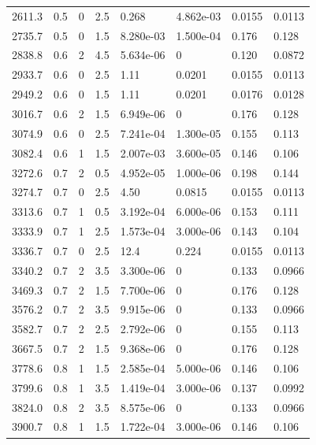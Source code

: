 \documentclass[preview]{standalone}
\begin{document}
{{{\begin{tabular}{L{1.2cm}C{1.2cm} C{0.3cm}C{0.5cm} C{1.4cm}C{1.4cm} C{1.4cm}C{1.4cm}}
  2611.3  &   0.5  & 0     & 2.5 &  0.268  & 4.862e-03  & 0.0155 &  0.0113   \\ 
  2735.7  &   0.5  & 0     & 1.5 &  8.280e-03  & 1.500e-04  & 0.176 &  0.128   \\ 
  2838.8  &   0.6  & 2     & 4.5 &  5.634e-06  & 0  & 0.120 &  0.0872   \\ 
  2933.7  &   0.6  & 0     & 2.5 &  1.11  & 0.0201  & 0.0155 &  0.0113   \\ 
  2949.2  &   0.6  & 0     & 1.5 &  1.11  & 0.0201  & 0.0176 &  0.0128   \\ 
  3016.7  &   0.6  & 2     & 1.5 &  6.949e-06  & 0  & 0.176 &  0.128   \\ 
  3074.9  &   0.6  & 0     & 2.5 &  7.241e-04  & 1.300e-05  & 0.155 &  0.113   \\ 
  3082.4  &   0.6  & 1     & 1.5 &  2.007e-03  & 3.600e-05  & 0.146 &  0.106   \\ 
  3272.6  &   0.7  & 2     & 0.5 &  4.952e-05  & 1.000e-06  & 0.198 &  0.144   \\ 
  3274.7  &   0.7  & 0     & 2.5 &  4.50  & 0.0815  & 0.0155 &  0.0113   \\ 
  3313.6  &   0.7  & 1     & 0.5 &  3.192e-04  & 6.000e-06  & 0.153 &  0.111   \\ 
  3333.9  &   0.7  & 1     & 2.5 &  1.573e-04  & 3.000e-06  & 0.143 &  0.104   \\ 
  3336.7  &   0.7  & 0     & 2.5 &  12.4  & 0.224  & 0.0155 &  0.0113   \\ 
  3340.2  &   0.7  & 2     & 3.5 &  3.300e-06  & 0  & 0.133 &  0.0966   \\ 
  3469.3  &   0.7  & 2     & 1.5 &  7.700e-06  & 0  & 0.176 &  0.128   \\ 
  3576.2  &   0.7  & 2     & 3.5 &  9.915e-06  & 0  & 0.133 &  0.0966   \\ 
  3582.7  &   0.7  & 2     & 2.5 &  2.792e-06  & 0  & 0.155 &  0.113   \\ 
  3667.5  &   0.7  & 2     & 1.5 &  9.368e-06  & 0  & 0.176 &  0.128   \\ 
  3778.6  &   0.8  & 1     & 1.5 &  2.585e-04  & 5.000e-06  & 0.146 &  0.106   \\ 
  3799.6  &   0.8  & 1     & 3.5 &  1.419e-04  & 3.000e-06  & 0.137 &  0.0992   \\ 
  3824.0  &   0.8  & 2     & 3.5 &  8.575e-06  & 0  & 0.133 &  0.0966   \\ 
  3900.7  &   0.8  & 1     & 1.5 &  1.722e-04  & 3.000e-06  & 0.146 &  0.106   \\ 

\end{tabular}}}}
\end{document}

